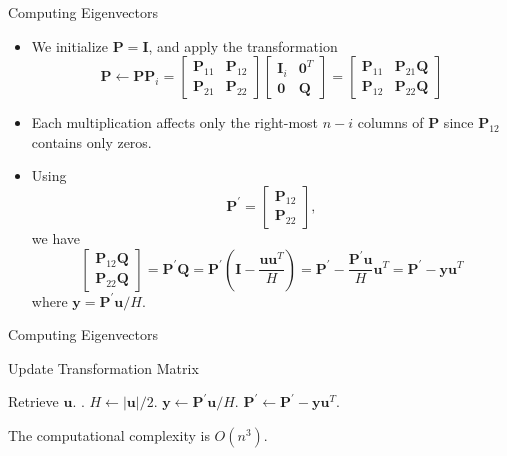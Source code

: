 \documentclass{beamer}
\begin{document}
\begin{frame}{Computing Eigenvectors}
    \begin{itemize}
        \item We initialize $\mathbf{P}=\mathbf{I}$, and apply the transformation
        \[
            \mathbf{P} \leftarrow \mathbf{P P}_i=\left[\begin{array}{ll}
                \mathbf{P}_{11} & \mathbf{P}_{12} \\
                \mathbf{P}_{21} & \mathbf{P}_{22}
                \end{array}\right]\left[\begin{array}{ll}
                \mathbf{I}_i & \mathbf{0}^T \\
                \mathbf{0} & \mathbf{Q}
                \end{array}\right]=\left[\begin{array}{ll}
                \mathbf{P}_{11} & \mathbf{P}_{21} \mathbf{Q} \\
                \mathbf{P}_{12} & \mathbf{P}_{22} \mathbf{Q}
                \end{array}\right]
        \]
       \item Each multiplication affects only the right-most $n-i$ columns of $\mathbf{P}$ since $\mathbf{P}_{12}$
       contains only zeros.
       \item Using 
       \[
       \mathbf{P}^{\prime}=\left[\begin{array}{l}
        \mathbf{P}_{12} \\
        \mathbf{P}_{22}
        \end{array}\right],
        \]
        we have
        \[\left[\begin{array}{l}
            \mathbf{P}_{12} \mathbf{Q} \\
            \mathbf{P}_{22} \mathbf{Q}
            \end{array}\right]=\mathbf{P}^{\prime} 
            \mathbf{Q}=\mathbf{P}^{\prime}\left(\mathbf{I}-\frac{\mathbf{u u}^T}{H}\right)
            =\mathbf{P}^{\prime}-\frac{\mathbf{P}^{\prime} \mathbf{u}}{H} \mathbf{u}^T
            =\mathbf{P}^{\prime}-\mathbf{y} \mathbf{u}^T
            \] where $\mathbf{y}=\mathbf{P}^{\prime} \mathbf{u} / H$.
    \end{itemize}
\end{frame}
\begin{frame}{Computing Eigenvectors}
    \begin{algorithm}[H]
        \caption{Update Transformation Matrix}
        \begin{algorithmic}
            \State Retrieve $\mathbf{u}$.
            .
            \State $H\gets|\mathbf{u}| / 2$.
            \State  $\mathbf{y}\gets \mathbf{P}^{\prime} \mathbf{u} / H$.
            \State $\mathbf{P}^{\prime} \gets \mathbf{P}^{\prime}-\mathbf{y} \mathbf{u}^T$.
        \end{algorithmic}
    \end{algorithm}
    The computational complexity is $O(n^3)$.
    
\end{frame}
\end{document}
